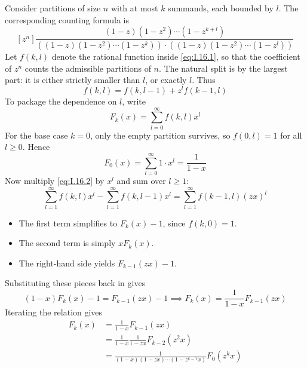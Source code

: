Consider partitions of size $n$ with at most $k$ summands, each bounded by $l$. The corresponding counting formula is
\begin{equation} \label{eq:I.16.1}
    [z^{n}] \frac{(1 - z)(1 - z^{2}) \cdots (1 - z^{k + l})}{((1 - z)(1 - z^{2}) \cdots (1 - z^{k})) \cdot ((1 - z)(1 - z^{2}) \cdots (1 - z^{l}))}
\end{equation}
Let $f(k, l)$ denote the rational function inside \eqref{eq:I.16.1}, so that the coefficient of $z^{n}$ counts the admissible partitions of $n$.
The natural split is by the largest part: it is either strictly smaller than $l$, or exactly $l$. Thus
\begin{equation} \label{eq:I.16.2}
    f(k, l) = f(k, l - 1) + z^{l}f(k - 1, l)
\end{equation}
To package the dependence on $l$, write
\begin{equation*}
    F_{k}(x) = \sum_{l = 0}^{\infty} f(k, l)x^{l}
\end{equation*}
For the base case $k = 0$, only the empty partition survives, so $f(0,l) = 1$ for all $l \geq 0$. Hence
\begin{equation*}
    F_{0}(x) = \sum_{l = 0}^{\infty}1 \cdot x^{l} = \frac{1}{1 - x}
\end{equation*}
Now multiply \eqref{eq:I.16.2} by $x^{l}$ and sum over $l \geq 1$:
\begin{equation*}
    \sum_{l = 1}^{\infty} f(k, l)x^{l} - \sum_{l = 1}^{\infty} f(k, l - 1)x^{l} = \sum_{l = 1}^{\infty} f(k - 1, l)(zx)^{l}
\end{equation*}
\begin{itemize}
    \item The first term simplifies to $F_{k}(x) - 1$, since $f(k, 0) = 1$.
    \item The second term is simply $x F_{k}(x)$.
    \item The right-hand side yields $F_{k - 1}(zx) - 1$.
\end{itemize}
Substituting these pieces back in gives
\begin{equation*}
    (1 - x)F_{k}(x) - 1 = F_{k - 1}(zx) - 1 \implies F_{k}(x) = \frac{1}{1 - x} F_{k - 1}(zx)
\end{equation*}
Iterating the relation gives
\begin{equation*}
    \begin{aligned}
        F_{k}(x)
        &= \frac{1}{1 - x} F_{k - 1}(zx) \\
        &= \frac{1}{1 - x} \frac{1}{1 - zx} F_{k - 2}(z^{2}x) \\
        &= \frac{1}{(1 - x)(1 - zx) \cdots (1 - z^{k - 1}x)}F_{0}(z^{k}x)
    \end{aligned}
\end{equation*}
